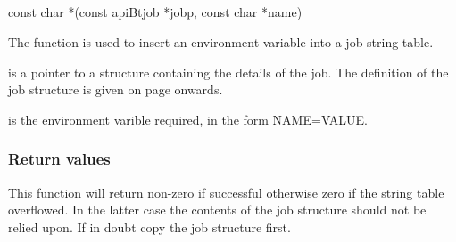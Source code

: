 \subsection{\funcnameXBputenv{}}

\begin{expara}

const char *\funcnameXBputenv{}(const apiBtjob *jobp, const char *name)

\end{expara}

The function \funcXBputenv{} is used to insert an
environment variable into a job string table.

 is a pointer to a structure containing the
details of the job. The definition of the job structure is given on
page \pageref{bkm:Jobstructure} onwards.

 is the environment varible required, in the
form NAME=VALUE.

\subsubsection{Return values}
This function will return non-zero if successful otherwise zero if the
string table overflowed. In the latter case the contents of the job
structure should not be relied upon. If in doubt copy the job structure
first.

